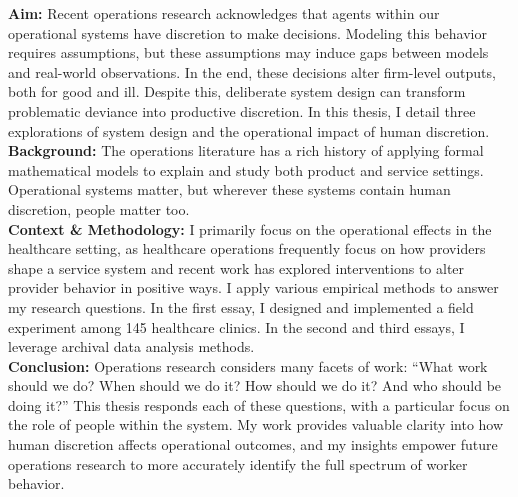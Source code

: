 \textbf{Aim:} Recent operations research acknowledges that agents within our operational systems have discretion to make decisions. Modeling this behavior requires assumptions, but these assumptions may induce gaps between models and real-world observations. In the end, these decisions alter firm-level outputs, both for good and ill. Despite this, deliberate system design can transform problematic deviance into productive discretion. In this thesis, I detail three explorations of system design and the operational impact of human discretion. \\
\textbf{Background:} The operations literature has a rich history of applying formal mathematical models to explain and study both product and service settings. Operational systems matter, but wherever these systems contain human discretion, people matter too. \\
\textbf{Context & Methodology:} I primarily focus on the operational effects in the healthcare setting, as healthcare operations frequently focus on how providers shape a service system and recent work has explored interventions to alter provider behavior in positive ways. I apply various empirical methods to answer my research questions. In the first essay, I designed and implemented a field experiment among 145 healthcare clinics. In the second and third essays, I leverage archival data analysis methods. \\
\textbf{Conclusion:} Operations research considers many facets of work: “What work should we do? When should we do it? How should we do it? And who should be doing it?” This thesis responds each of these questions, with a particular focus on the role of people within the system. My work provides valuable clarity into how human discretion affects operational outcomes, and my insights empower future operations research to more accurately identify the full spectrum of worker behavior. \\


\clearpage
